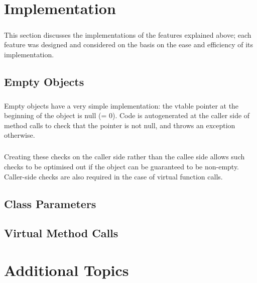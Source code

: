 \documentclass[12pt,twoside,notitlepage]{report}
\begin{document}
\cleardoublepage

\chapter{Implementation}

\paragraph{}
This section discusses the implementations of the features explained above; each feature was designed and considered on the basis on the ease and efficiency of its implementation.

\section{Empty Objects}

\paragraph{}
Empty objects have a very simple implementation: the vtable pointer at the beginning of the object is null (= 0). Code is autogenerated at the caller side of method calls to check that the pointer is not null, and throws an exception otherwise.

\paragraph{}
Creating these checks on the caller side rather than the callee side allows such checks to be optimised out if the object can be guaranteed to be non-empty. Caller-side checks are also required in the case of virtual function calls.

\section{Class Parameters}

\paragraph{}


\section{Virtual Method Calls}

\cleardoublepage

\chapter{Additional Topics}
\end{document}
